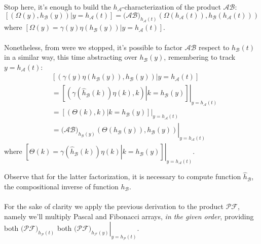 Stop here, it's enough to build the $h_{\mathcal{A}}$-characterization 
of the product $\mathcal{A}\mathcal{B}$:
\begin{displaymath}
        \left[\left.\left(\Omega(y), h_{\mathcal{B}}(y)  \right) \right| y=h_{\mathcal{A}}(t) \right] 
        =\big(\mathcal{A}\mathcal{B}\big)_{h_{\mathcal{A}}(t)}\left(
            \Omega(h_{\mathcal{A}}(t)), h_{\mathcal{B}}(h_{\mathcal{A}}(t))  \right)
\end{displaymath}
where $\left[\left.\Omega(y)= \gamma(y)\eta(h_{\mathcal{B}}(y))\right| y=h_{\mathcal{A}}(t) \right]$. 
\\\\
Nonetheless, 
from were we stopped, it's possible to factor $\mathcal{A}\mathcal{B}$ respect to $h_{\mathcal{B}}(t)$ in
a similar way, this time abstracting over $h_{\mathcal{B}}(y)$, remembering to track $y=h_{\mathcal{A}}(t)$:
\begin{displaymath}
    \begin{split}
        &\left[\left.\left(\gamma(y)\eta(h_{\mathcal{B}}(y)), h_{\mathcal{B}}(y)  \right) \right|
             y=h_{\mathcal{A}}(t) \right]\\
        &=\left.\left[\left.\left(\gamma(\hat{h}_{\mathcal{B}}(k))\eta(k), k  \right) \right|
             k=h_{\mathcal{B}}(y) \right]\right|_{y=h_{\mathcal{A}}(t)}\\
        &=\left.\left[\left.\left(\Theta(k), k  \right) \right| k=h_{\mathcal{B}}(y) \right]\right|_{y=h_{\mathcal{A}}(t)}\\
        &=\left.\big(\mathcal{A}\mathcal{B}\big)_{h_{\mathcal{B}}(y)}\left(
            \Theta(h_{\mathcal{B}}(y)), h_{\mathcal{B}}(y)  \right)\right|_{y=h_{\mathcal{A}}(t)}
    \end{split}
\end{displaymath}
where $\left.\left[\left.\Theta(k)=\gamma(\hat{h}_{\mathcal{B}}(k))\eta(k) \right| 
    k=h_{\mathcal{B}}(y) \right]\right|_{y=h_{\mathcal{A}}(t)}$.

Observe that for the latter factorization, it is necessary to compute function $\hat{h}_{\mathcal{B}}$, 
the compositional inverse of function $h_{\mathcal{B}}$.
\\\\
For the sake of clarity we apply the previous derivation to the product $\mathcal{P}\mathcal{F}$, namely
we'll multiply Pascal and Fibonacci arrays, \emph{in the given order}, providing 
both $\big(\mathcal{P}\mathcal{F}\big)_{h_{\mathcal{P}}(t)}$ 
both $\left.\big(\mathcal{P}\mathcal{F}\big)_{h_{\mathcal{F}}(y)}\right|_{y=h_{\mathcal{P}}(t)}$.

